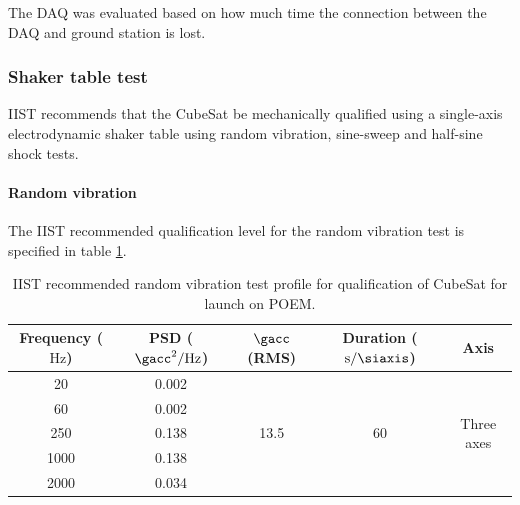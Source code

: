 \documentclass[draft]{report}
\begin{document}
The DAQ was evaluated based on how much time the connection between the DAQ and ground station is lost.

\subsubsection{Shaker table test}
\label{sec:shaker-table-test}

IIST recommends that the CubeSat be mechanically qualified using a single-axis electrodynamic shaker table using random vibration, sine-sweep and half-sine shock tests.

\paragraph{Random vibration}

The IIST recommended qualification level for the random vibration test is specified in table \ref{tabl:random-vibration-profile-iist}.

\begin{table}[t]
  \centering
  \begin{tabular}{|c | c | c | c | c|}
    \hline
    \textbf{Frequency ($\si{\hertz}$)} & \textbf{PSD ($\si{\square\gacc\per\hertz}$)} & \textbf{$\si{\gacc}$ (RMS)} & \textbf{Duration ($\si{\second\per\siaxis}$)} & \textbf{Axis}               \\ \hline
    20                                 & 0.002                                        & \multirow{5}{*}{13.5}       & \multirow{5}{*}{60}                           & \multirow{5}{*}{Three axes} \\ \cline{1-2}
    60                                 & 0.002                                        &                             &                                               &                             \\ \cline{1-2}
    250                                & 0.138                                        &                             &                                               &                             \\ \cline{1-2}
    1000                               & 0.138                                        &                             &                                               &                             \\ \cline{1-2}
    2000                               & 0.034                                        &                             &                                               &                             \\ \hline
  \end{tabular}
  \caption{IIST recommended random vibration test profile for qualification of CubeSat for launch on POEM.}
  \label{tabl:random-vibration-profile-iist}
\end{table}
\end{document}
